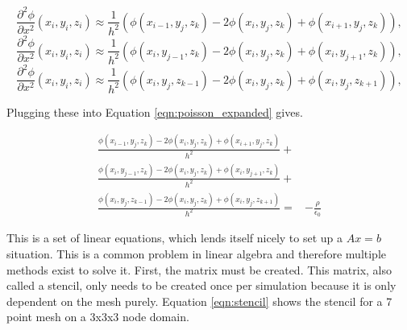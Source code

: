 \begin{equation}
    \label{eqn:x_partial}
    \frac{\partial^2 \phi}{\partial x^2}(x_i,y_i,z_i) \approx \frac{1}{h^2}(\phi(x_{i-1},y_j,z_k) - 2\phi(x_i,y_j,z_k) + \phi(x_{i+1},y_j,z_k)),
\end{equation}
\begin{equation}
    \label{eqn:y_partial}
    \frac{\partial^2 \phi}{\partial x^2}(x_i,y_i,z_i) \approx \frac{1}{h^2}(\phi(x_i,y_{j-1},z_k) - 2\phi(x_i,y_j,z_k) + \phi(x_i,y_{j+1},z_k)),
\end{equation}
\begin{equation}
    \label{eqn:z_partial}
    \frac{\partial^2 \phi}{\partial x^2}(x_i,y_i,z_i) \approx \frac{1}{h^2}(\phi(x_i,y_j,z_{k-1}) - 2\phi(x_i,y_j,z_k) + \phi(x_i,y_j,z_{k+1})),
\end{equation}

Plugging these into Equation \ref{eqn:poisson_expanded} gives.

\begin{align}\label{eqn:poisson_full}
    \frac{\phi(x_{i-1},y_j,z_k) - 2\phi(x_i,y_j,z_k) + \phi(x_{i+1},y_j,z_k)}{h^2} +& \nonumber \\
    \frac{\phi(x_i,y_{j-1},z_k) - 2\phi(x_i,y_j,z_k) + \phi(x_i,y_{j+1},z_k)}{h^2} +& \nonumber \\
    \frac{\phi(x_i,y_j,z_{k-1}) - 2\phi(x_i,y_j,z_k) + \phi(x_i,y_j,z_{k+1})}{h^2} =& - \frac{\rho}{\epsilon_0}
\end{align}

This is a set of linear equations, which lends itself nicely to set up a \(A x = b\) situation. This is a common problem in linear algebra and therefore multiple methods exist to solve it. First, the matrix must be created. This matrix, also called a stencil, only needs to be created once per simulation because it is only dependent on the mesh purely. Equation \ref{eqn:stencil} shows the stencil for a 7 point mesh on a 3x3x3 node domain. \par

